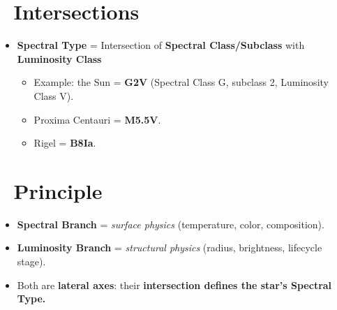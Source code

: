 \documentclass[
  letterpaper,
]{book}
\providecommand{\tightlist}{%
  \setlength{\itemsep}{0pt}\setlength{\parskip}{0pt}}
\begin{document}
\section{🔄 Intersections}\label{intersections}

\begin{itemize}
\tightlist
\item
  \textbf{Spectral Type} = Intersection of \textbf{Spectral
  Class/Subclass} with \textbf{Luminosity Class}

  \begin{itemize}
  \tightlist
  \item
    Example: the Sun = \textbf{G2V} (Spectral Class G, subclass 2,
    Luminosity Class V).\\
  \item
    Proxima Centauri = \textbf{M5.5V}.\\
  \item
    Rigel = \textbf{B8Ia}.
  \end{itemize}
\end{itemize}

\section{🧭 Principle}\label{principle}

\begin{itemize}
\tightlist
\item
  \textbf{Spectral Branch} = \emph{surface physics} (temperature, color,
  composition).\\
\item
  \textbf{Luminosity Branch} = \emph{structural physics} (radius,
  brightness, lifecycle stage).\\
\item
  Both are \textbf{lateral axes}: their \textbf{intersection defines the
  star's Spectral Type.}
\end{itemize}
\end{document}
